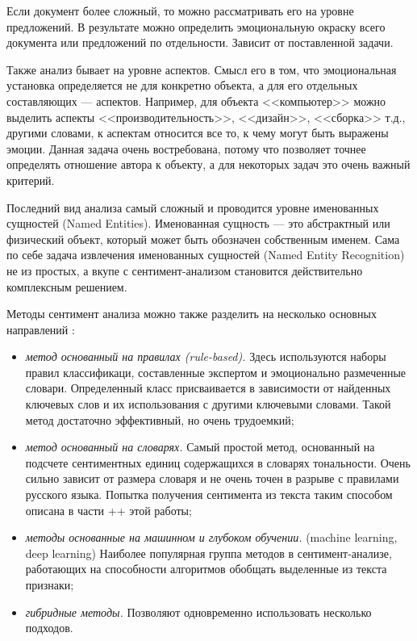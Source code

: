 \bigskip\par
Если документ более сложный, то можно рассматривать его на уровне предложений. В результате можно определить
эмоциональную окраску всего документа или предложений по отдельности. Зависит от поставленной задачи.

\bigskip\par
Также анализ бывает на уровне аспектов. Смысл его в том, что эмоциональная установка определяется не для
конкретно объекта, а для его отдельных составляющих --- аспектов. Например, для объекта <<компьютер>> можно
выделить аспекты <<производительность>>, <<дизайн>>, <<сборка>> т.д., другими словами, к аспектам относится
все то, к чему могут быть выражены эмоции. Данная задача очень востребована, потому что позволяет точнее
определять отношение автора к объекту, а для некоторых задач это очень важный критерий.

\bigskip\par
Последний вид анализа самый сложный и проводится уровне именованных сущностей (Named Entities). Именованная
сущность --- это абстрактный или физический объект, который может быть обозначен собственным именем. Сама по
себе задача извлечения именованных сущностей (Named Entity Recognition) не из простых, а вкупе с
сентимент-анализом становится действительно комплексным решением.


\bigskip\par
Методы сентимент анализа можно также разделить на несколько основных направлений \cite{Semina}:
\bigskip
\begin{itemize}
 \item \textit{метод основанный на правилах (rule-based).} Здесь используются наборы правил классификаци, составленные экспертом и эмоционально размеченные словари. Определенный класс присваивается в зависимости от найденных ключевых слов и их использования с другими ключевыми словами. Такой метод достаточно эффективный, но очень трудоемкий; %

 \item \textit{метод основанный на словарях.} Самый простой метод, основанный  на подсчете сентиментных единиц содержащихся в словарях тональности. Очень сильно зависит от размера словаря и не очень точен в разрыве с правилами русского языка. Попытка получения сентимента из текста таким способом описана в части ++ этой работы;

 \item \textit{методы основанные на машинном и глубоком обучении.} (machine learning, deep learning) Наиболее популярная группа методов в сентимент-анализе, работающих на способности алгоритмов обобщать выделенные из текста признаки;

 \item \textit{гибридные методы.} Позволяют одновременно использовать несколько подходов. %
\end{itemize}

